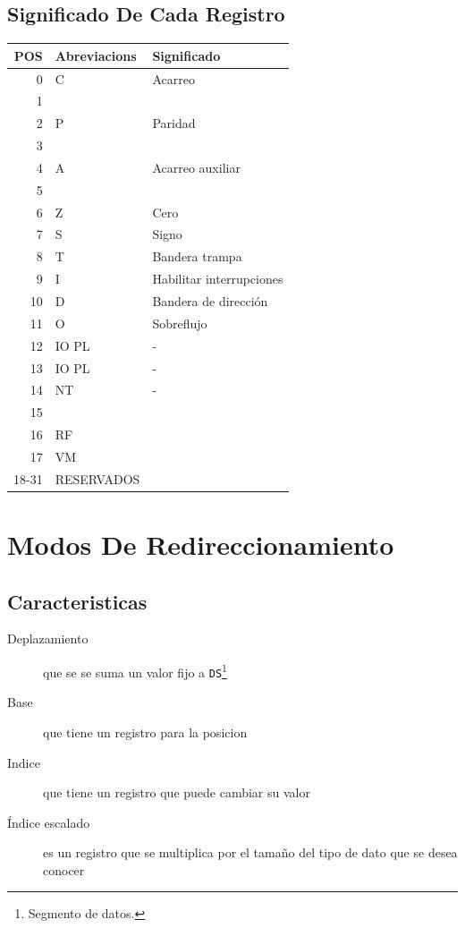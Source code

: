 \documentclass[12pt]{article}
\begin{document}
\subsection*{Significado De Cada Registro}
\label{sec:org196114b}
\begin{center}
\begin{tabular}{|r|l|l|}
\hline
POS & Abreviacions & Significado\\
\hline
0 & C & Acarreo\\
1 &  & \\
2 & P & Paridad\\
3 &  & \\
4 & A & Acarreo auxiliar\\
5 &  & \\
6 & Z & Cero\\
7 & S & Signo\\
8 & T & Bandera trampa\\
9 & I & Habilitar interrupciones\\
10 & D & Bandera de dirección\\
11 & O & Sobreflujo\\
12 & IO PL & -\\
13 & IO PL & -\\
14 & NT & -\\
15 &  & \\
16 & RF & \\
17 & VM & \\
\hline
18-31 & RESERVADOS & \\
\hline
\end{tabular}
\end{center}

\section*{Modos De Redireccionamiento}
\label{sec:org202ee26}
\subsection*{Caracteristicas}
\label{sec:org61a6285}
\begin{description}
\item[{Deplazamiento}] que se se suma un valor fijo a \texttt{DS}\footnote{Segmento de datos.}
\item[{Base}] que tiene un registro para la posicion
\item[{Indice}] que tiene un registro que puede cambiar su valor
\item[{Índice escalado}] es un registro que se multiplica por el tamaño del tipo de dato que se desea conocer
\end{description}
\end{document}
